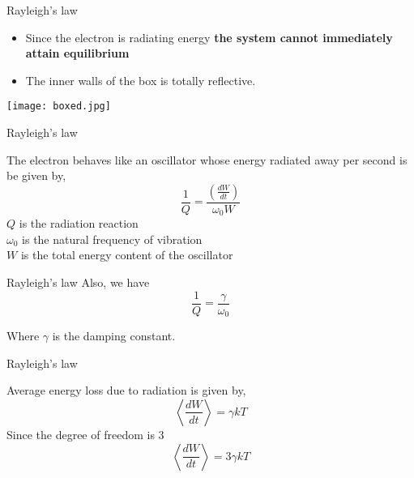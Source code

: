 \documentclass[aspectratio=169]{beamer}
\begin{document}
\begin{frame}{Rayleigh's law}

	 	
		\begin{multicols}{2} 
		
  			\begin{itemize}
  			
  				\item {\large Since the electron is radiating energy \textbf{the system cannot immediately attain equilibrium}}
  				\item {\large The inner walls of the box is totally reflective.}
  				
  			\end{itemize}
  				
 	
	\columnbreak
	
			\texttt{[image: boxed.jpg]}
			
		\end{multicols}
		

	
\end{frame}
		
\begin{frame}{Rayleigh's law}
		
		The electron behaves like an oscillator whose energy radiated away per second is be given by, \newline
		{\large \[ \frac{1}{Q} = \frac{\left(\frac{dW}{dt}\right)}{\omega_0 W}\]}\newline
			{\small $Q$ is the radiation reaction \\ $\omega_0$ is the natural frequency of vibration \\ $W$ is the total energy content of the oscillator} 
				
\end{frame}
	
		
\begin{frame}{Rayleigh's law}
		Also, we have 
		\[ \frac{1}{Q}= \frac{\gamma}{\omega_0} \]
			
			\begin{center}		
				{\small Where $\gamma$ is the damping constant.}
			\end{center}
			
		
\end{frame}


\begin{frame}{Rayleigh's law}

	 \begin{center}
	 
	 	{\large Average energy loss due to radiation is given by,}
	 {\large \[ \left<\frac{dW}{dt}\right> = \gamma kT\]}	 
	  {\large Since the degree of freedom is 3}
	 {\large \[ \left<\frac{dW}{dt}\right> = 3 \gamma kT\]}
	  \end{center} 
\end{frame}
		
\end{document}
